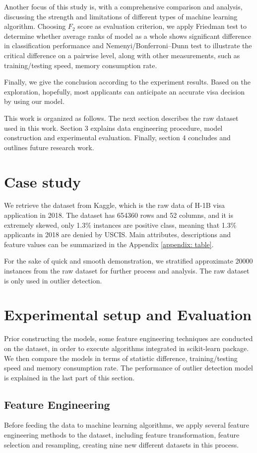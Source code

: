 Another focus of this study is, with a comprehensive comparison and analysis, discussing the strength and limitations of different types of machine learning algorithm. Choosing $F_2$ score as evaluation criterion, we apply Friedman test to determine whether average ranks of model as a whole shows significant difference in classification performance and Nemenyi/Bonferroni–Dunn test to illustrate the critical difference on a pairwise level, along with other measurements, such as training/testing speed, memory consumption rate.

Finally, we give the conclusion according to the experiment results. Based on the exploration, hopefully, most applicants can anticipate an accurate visa decision by using our model.

This work is organized as follows. The next section describes the raw dataset used in this work. Section 3 explains data engineering procedure, model construction and experimental evaluation. Finally, section 4 concludes and outlines future research work.

\section{Case study}
We retrieve the dataset from Kaggle\citep{Anbarasan}, which is the raw data of H-1B visa application in 2018. The dataset has 654360 rows and 52 columns, and it is extremely skewed, only 1.3\% instances are positive class, meaning that 1.3\% applicants in 2018 are denied by USCIS. Main attributes, descriptions and feature values can be summarized in the Appendix \ref{appendix: table}.

For the sake of quick and smooth demonstration, we stratified approximate 20000 instances from the raw dataset for further process and analysis. The raw dataset is only used in outlier detection.
\section{Experimental setup and Evaluation}
Prior constructing the models, some feature engineering techniques are conducted on the dataset, in order to execute algorithms integrated in scikit-learn package. We then compare the models in terms of statistic difference, training/testing speed and memory consumption rate. The performance of outlier detection model is explained in the last part of this section.
\subsection{Feature Engineering}
Before feeding the data to machine learning algorithms, we apply several feature engineering methods to the dataset, including feature transformation, feature selection and resampling, creating nine new different datasets in this process.
